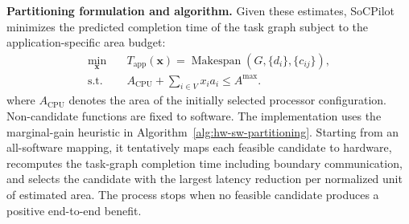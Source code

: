 \textbf{Partitioning formulation and algorithm.}
Given these estimates, SoCPilot minimizes the predicted completion time of
the task graph subject to the application-specific area budget:
\begin{equation}
\begin{aligned}
\min_{\mathbf{x}}\quad &T_{\mathrm{app}}(\mathbf{x})
=\operatorname{Makespan}\!\left(G,\{d_i\},\{c_{ij}\}\right),\\
\mathrm{s.t.}\quad &A_{\mathrm{CPU}}+\sum_{i\in V}x_i a_i\leq A^{\max}.
\end{aligned}
\label{eq:partition}
\end{equation}
where $A_{\mathrm{CPU}}$ denotes the area of the initially selected processor configuration. Non-candidate functions are fixed to software. The implementation uses the marginal-gain heuristic in Algorithm~\ref{alg:hw-sw-partitioning}. Starting from an all-software mapping, it tentatively maps each feasible candidate to hardware, recomputes the task-graph completion time including boundary communication, and selects the candidate with the largest latency reduction per normalized unit of estimated area. The process stops when no feasible candidate produces a positive end-to-end benefit.


